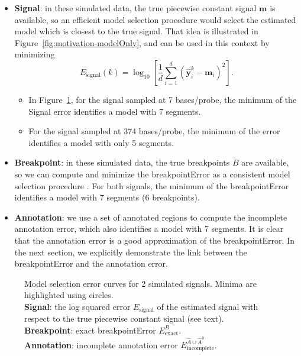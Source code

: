 \documentclass{article}
\begin{document}
\begin{itemize}
\item \textbf{Signal}: in these simulated data, the true piecewise
  constant signal $\mathbf m$ is available, so an efficient model
  selection procedure \citep{sylvain-survey} would select the
  estimated model which is closest to the true signal. That idea is
  illustrated in Figure~\ref{fig:motivation-modelOnly}, and can be
  used in this context by minimizing
  \begin{equation}
    \label{eq:signal_cost}
    E_{\text{signal}}(k) = \log_{10}\left[
\frac 1 d \sum_{i=1}^d(\mathbf{\hat y}_i^k - \mathbf m_i)^2
\right].
  \end{equation}
  \begin{itemize}
  \item In Figure~\ref{fig:variable-density-sigerr-small}, for the
    signal sampled at 7 bases/probe, the minimum of the Signal error
    identifies a model with 7 segments.
  \item For the signal sampled at 374 bases/probe, the minimum of the
    error identifies a model with only 5 segments.
  \end{itemize}
\item \textbf{Breakpoint}: in these simulated data, the true
  breakpoints $B$ are available, so we can compute and minimize the
  breakpointError as a consistent model selection procedure
  \citep{sylvain-survey}. For both signals, the minimum of the
  breakpointError identifies a model with 7 segments (6
  breakpoints).
\item \textbf{Annotation}: we use a set of annotated regions to
  compute the incomplete annotation error, which also identifies a
  model with 7 segments. It is clear that the annotation error is a
  good approximation of the breakpointError. In the next section, we
  explicitly demonstrate the link between the breakpointError and the
  annotation error.
\end{itemize}
\begin{figure}[H]
  \centering
  
  \vskip -0.5cm
  \caption{Model selection error curves for 2 simulated
    signals. Minima are highlighted using circles.
    \protect\\
    \textbf{Signal}: the log squared error $E_{\text{signal}}$ of the
    estimated signal with respect to the
    true piecewise constant signal (see text).
    \protect\\
    \textbf{Breakpoint}: exact breakpointError $E^B_{\text{exact}}$.
    \protect\\
    \textbf{Annotation}: incomplete annotation error
    $E^{\hat A\cup \hat A^0}_{\text{incomplete}}$.
}
  \label{fig:variable-density-sigerr-small}
\end{figure}
\end{document}
